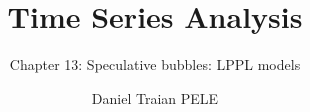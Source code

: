 \title[Time Series Analysis]{Time Series Analysis}
\subtitle{Chapter 13: Speculative bubbles: LPPL models}
\author[D.T. Pele]{Daniel Traian PELE}
\date{}

\providecommand{\tsaapplink}[3]{\hypertarget{#2}{}\hyperlink{#1}{\beamergotobutton{#3}}}  %
\providecommand{\tsaappback}[2]{\begin{tikzpicture}[remember picture,overlay]\node[anchor=south east] at ([xshift=-3mm,yshift=7mm]current page.south east){\hyperlink{#1}{\beamerreturnbutton{#2}}};\end{tikzpicture}}  %
\providecommand{\tsachlink}[2]{\href{#1}{#2}}  %
\providecommand{\tsachlinkt}[2]{\href{#1}{\usebeamercolor[fg]{frametitle}#2}}  %


